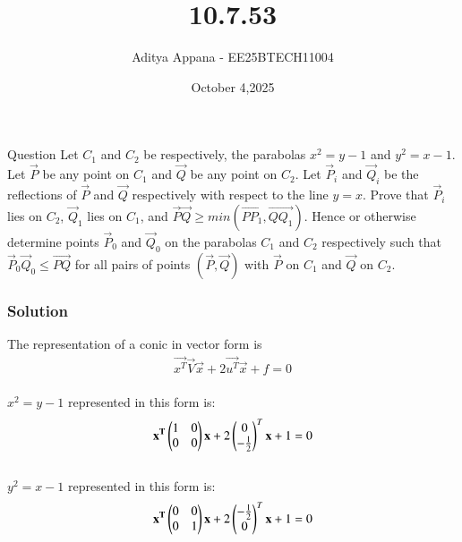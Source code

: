\documentclass{beamer}
\title %
{10.7.53}
\date{October 4,2025}
\author %
{Aditya Appana - EE25BTECH11004}
\begin{document}
\frame{\titlepage}
\begin{frame}{Question}
Let $C_1$ and $C_2$ be respectively, the parabolas $x^2 = y- 1$ and $y^2 = x - 1$. Let $\vec{P}$ be any
point on $C_1$ and $\vec{Q}$ be any point on $C_2$. Let $\vec{P}_i$ and $\vec{Q}_i$ be the reflections of $\vec{P}$ and $\vec{Q}$
respectively with respect to the line $y = x$. Prove that $\vec{P}_i$ lies on $C_2$, $\vec{Q}_1$ lies on $C_1$,
and $\vec{P}\vec{Q} \geq min(\vec{PP_1}, \vec{QQ_1})$. Hence or otherwise determine points $\vec{P}_0$ and $\vec{Q}_0$  on the parabolas $C_1$ and $C_2$ respectively such that $\vec{P}_0\vec{Q}_0 \leq \vec{PQ}$ for all pairs of points $(\vec{P}, \vec{Q})$
with $\vec{P}$ on $C_1$ and $\vec{Q}$ on $C_2$.
\end{frame}



\begin{frame}[fragile]
    \frametitle{Solution}
The representation of a conic in vector form is \begin{align}\vec{x^T}\vec{V}\vec{x} + 2\vec{u^T}\vec{x}+f = 0\end{align}\\
$x^2 = y- 1$ represented in this form is:
\begin{align}\mathbf{x^T}\begin{pmatrix}1&0\\0&0\end{pmatrix}\mathbf{x} + 2\begin{pmatrix}0 \\ -\frac{1}{2}\end{pmatrix}^T\mathbf{x}+1 = 0\end{align}\\
$y^2 = x- 1$ represented in this form is:
\begin{align}\mathbf{x^T}\begin{pmatrix}0&0\\0&1\end{pmatrix}\mathbf{x} + 2\begin{pmatrix}-\frac{1}{2}\\0\end{pmatrix}^T\mathbf{x}+1 = 0\end{align}\\
\end{frame}
\end{document}
